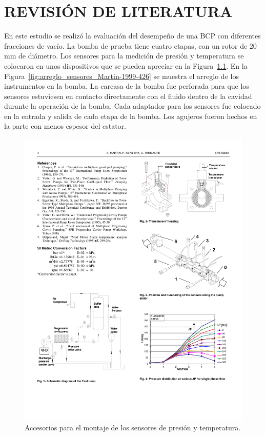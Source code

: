 \chapter{REVISIÓN DE LITERATURA}


\textcite{Martin1999}

En este estudio se realizó la evaluación del desempeño de una BCP  con diferentes fracciones de vacío. La bomba de prueba tiene cuatro etapas, con un rotor de 20 mm de diámetro. Los sensores para la medición de presión y temperatura se colocaron en unos dispositivos que se pueden apreciar en la Figura~\ref{fig:Accesorios_montaje_Martin-1999-426}. En la Figura~\ref{fig:arreglo_sensores_Martin-1999-426} se muestra el arreglo de los instrumentos en la bomba. La carcasa de la bomba fue perforada para que los sensores estuviesen en contacto directamente con el fluido dentro de la cavidad durante la operación de la bomba. Cada adaptador para los sensores fue colocado en la entrada y salida de cada etapa de la bomba. Los agujeros fueron hechos en la parte con menos espesor del estator.



\begin{figure}

\centering
		
\includegraphics[scale=1,draft=false]{Accesorios_montaje_Martin-1999-426} 


\caption{Accesorios para el montaje de los sensores de presión y temperatura.}

\label{fig:Accesorios_montaje_Martin-1999-426}

\end{figure}

